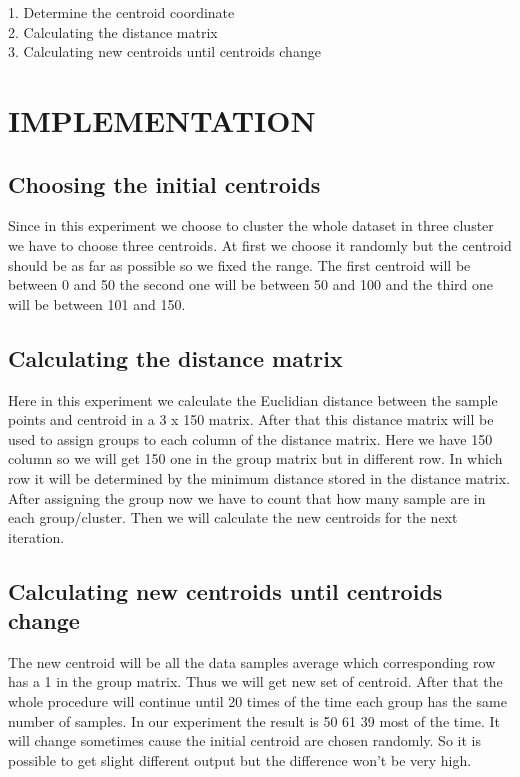 \documentclass[conference]{IEEEtran}
\begin{document}
1. Determine the centroid coordinate \\
2. Calculating the distance matrix \\
3. Calculating new centroids until centroids change\\

\section{IMPLEMENTATION}

\subsection{Choosing the initial centroids}

Since in this experiment we choose to cluster the whole dataset in three cluster we have to choose three centroids. At first we choose it randomly but the centroid should be as far as possible so we fixed the range. The first centroid will be between 0 and 50 the second one will be between 50 and 100 and the third one will be between 101 and 150.

\subsection{Calculating the distance matrix}

Here in this experiment we calculate the Euclidian distance between the sample points and centroid in a 3 x 150 matrix. After that this distance matrix will be used to assign groups to each column of the distance matrix. Here we have 150 column so we will get 150 one in the group matrix but in different row. In which row it will be determined by the minimum distance stored in the distance matrix.  After assigning the group now we have to count that how many sample are in each group/cluster. Then we will calculate the new centroids for the next iteration. 

\subsection{Calculating new centroids until centroids change}

The new centroid will be all the data samples average which corresponding row has a 1 in the group matrix. Thus we will get new set of centroid. After that the whole procedure will continue until 20 times of the time each group has the same number of samples.  In our experiment the result is 50 61 39 most of the time. It will change sometimes cause the initial centroid are chosen randomly. So it is possible to get slight different output but the difference won’t be very high.
\end{document}
